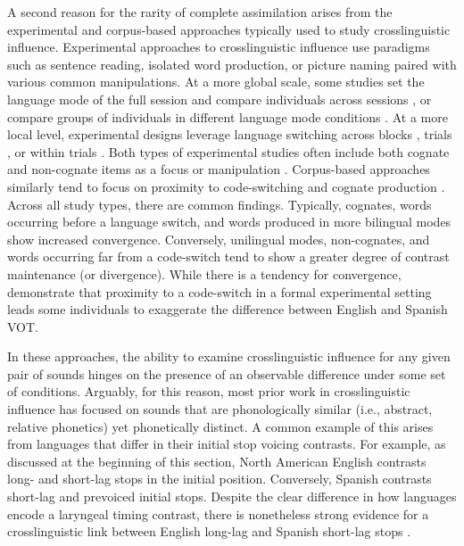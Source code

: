 A second reason for the rarity of complete assimilation arises from the experimental and corpus-based approaches typically used to study crosslinguistic influence. Experimental approaches to crosslinguistic influence use paradigms such as sentence reading, isolated word production, or picture naming paired with various common manipulations. At a more global scale, some studies set the language mode of the full session and compare individuals across sessions \citep{grosjean_2011_transfer, simonet_2019_convergence, sancier_1997_drift}, or compare groups of individuals in different language mode conditions \citep{antoniou_2010_context}. At a more local level, experimental designs leverage language switching across blocks \citep{sundara_2006_production}, trials \citep{goldrick_2014_switching}, or within trials \citep[i.e., prompted code-switching][]{bullock_2009_sociophonetics, antoniou_2011_VOT, olson_2016_transfer}. Both types of experimental studies often include both cognate and non-cognate items as a focus or manipulation \citep[e.g.,][]{goldrick_2014_switching}. Corpus-based approaches similarly tend to focus on proximity to code-switching \citep{fricke_2016_phonetic, balukas_2015_vot} and cognate production \citep{brown_2015_finegrained}. Across all study types, there are common findings. Typically, cognates, words occurring before a language switch, and words produced in more bilingual modes show increased convergence. Conversely, unilingual modes, non-cognates, and words occurring far from a code-switch tend to show a greater degree of contrast maintenance (or divergence). While there is a tendency for convergence, \citet{bullock_2009_sociophonetics} demonstrate that proximity to a code-switch in a formal experimental setting leads some individuals to exaggerate the difference between English and Spanish VOT. 

In these approaches, the ability to examine crosslinguistic influence for any given pair of sounds hinges on the presence of an observable difference under some set of conditions. Arguably, for this reason, most prior work in crosslinguistic influence has focused on sounds that are phonologically similar (i.e., abstract, relative phonetics) yet phonetically distinct. A common example of this arises from languages that differ in their initial stop voicing contrasts. For example, as discussed at the beginning of this section, North American English contrasts long- and short-lag stops in the initial position. Conversely, Spanish contrasts short-lag and prevoiced initial stops. Despite the clear difference in how languages encode a laryngeal timing contrast, there is nonetheless strong evidence for a crosslinguistic link between English long-lag and Spanish short-lag stops \citep{casillas_2021_interlingual, fricke_2016_phonetic, goldrick_2014_switching, bullock_2009_sociophonetics, olson_2016_transfer}. 

